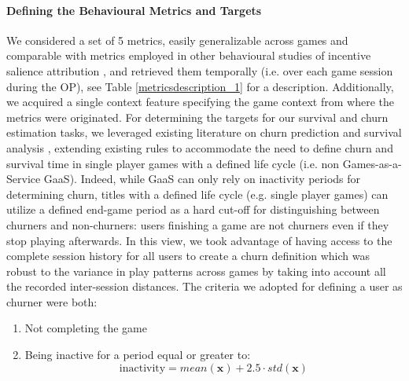 \paragraph*{Defining the Behavioural Metrics and Targets}
\label{behavioural_metric_targets_1}
We considered a set of 5 metrics, easily generalizable across games and comparable with metrics employed in other behavioural studies of incentive salience attribution \cite{berridge1998role,mcclure2003computational,zhang2009neural}, and retrieved them temporally  (i.e. over each game session during the OP), see Table \ref{metricsdescription_1} for a description. Additionally, we acquired a single context feature specifying the game context from where the metrics were originated. For determining the targets for our survival and churn estimation tasks, we leveraged existing literature on churn prediction \cite{drachen2016rapid, milovsevic2017early, lee2018game, perianez2016churn, runge2014churn, kim2017churn, hadiji2014predicting, xie2015predicting} and survival analysis \cite{viljanen2018playtime, demediuk2018player, lee2018game, bertens2017games}, extending existing rules to accommodate the need to define churn and survival time in single player games with a defined life cycle (i.e. non Games-as-a-Service GaaS). Indeed, while GaaS can only rely on inactivity periods for determining churn, titles with a defined life cycle (e.g. single player games) can utilize a defined end-game period as a hard cut-off for distinguishing between churners and non-churners: users finishing a game are not churners even if they stop playing afterwards. In this view, we took advantage of having access to the complete session history for all users to create a churn definition which was robust to the variance in play patterns across games by taking into account all the recorded inter-session distances. The criteria we adopted for defining a user as churner were both: 

\begin{enumerate}
    \item Not completing the game
    \item Being inactive for a period equal or greater to:
        \begin{equation}
            \label{inactivityrule}
            \text{inactivity} = 
            mean(\mathbf{x}) + 2.5 \cdot std(\mathbf{x})
        \end{equation}
\end{enumerate}


